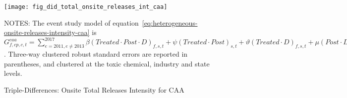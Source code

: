 \begin{figure}[H]
    \centering
    \texttt{[image: fig\_did\_total\_onsite\_releases\_int\_caa]}
    \caption{Triple-Differences: Onsite Total Releases Intensity for CAA}
    \label{fig:heterogeneous-onsite-releases-intensity-caa}
    \begin{minipage}{18cm}
        \vspace{0.05in}
        NOTES: The event study model of equation~\ref{eq:heterogeneous-onsite-releases-intensity-caa} is $G_{f,cp,c,t}^{caa} = \sum_{{e = 2011},{e \neq 2013}}^{2017} \beta (Treated \cdot Post \cdot D)_{f,s,t} + \psi (Treated \cdot Post)_{s,t} + \vartheta (Treated \cdot D)_{f,s,t} + \mu (Post \cdot D)_{f,s,t} + \tau Treated_{s,t} + \rho D_{f,s,t} + \alpha Post_{t} + \delta X_{v,c,t-1} + \omega F_{f,t} + \lambda_{t} + \gamma_{f} + \phi_{cp} + \zeta_{c} + \eta_{c,t} + \varepsilon_{f,cp,c,t}$. Three-way clustered robust standard errors are reported in parentheses, and clustered at the toxic chemical, industry and state levels.
    \end{minipage}
\end{figure}